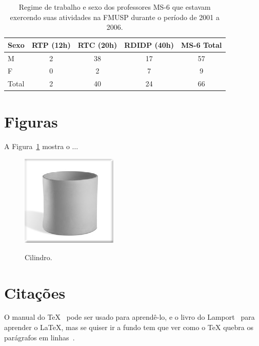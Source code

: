 \documentclass[
12pt,        %
openright,   %
twoside,     %
a4paper,     %
english,       %
brazil        %
%
%
]{ppgca}
\begin{document}
\begin{table}[h]
\caption{Regime de trabalho e sexo dos professores MS-6 que estavam
  exercendo suas atividades na FMUSP durante o período de 2001 a 2006.}
\label{tab:regime}
  \centering
\begin{tabular}{l|c|c|c|c}\hline
 Sexo & RTP (12h) &  RTC (20h) & RDIDP (40h) & MS-6  Total \\\hline
M     &  2        &  38       &  17         & 57          \\
F    &  0        &   2       &   7         &  9          \\
Total&  2        &   40      &   24        &  66         \\\hline
\end{tabular}
\end{table}

\section{Figuras}

A Figura~\ref{fig:cilindro} mostra o $\ldots$

\begin{figure}[ht]
  \caption{Cilindro.}
  \centering
  \includegraphics{cilindro}
  \label{fig:cilindro}
\end{figure}

\section{Citações}

O manual do \TeX~ pode ser usado para
aprendê-lo, e o livro do Lamport~\cite{lamport1994} para aprender o
\LaTeX{}, mas se quiser ir a fundo tem que ver como o \TeX
quebra os parágrafos em linhas~.

\end{document}
